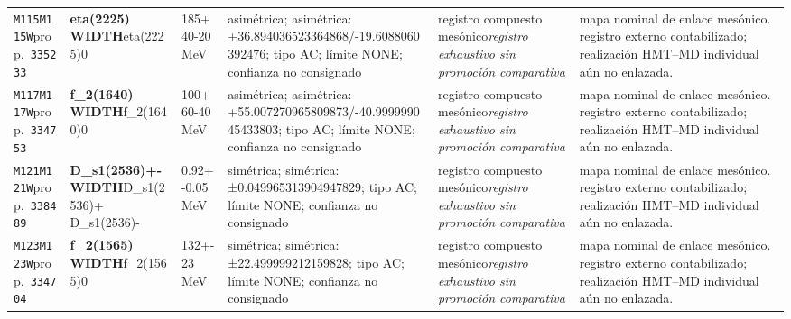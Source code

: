 \begin{landscape}
\begin{longtable}{L{1.85cm}L{4.45cm}L{2.35cm}L{4.05cm}L{3.35cm}L{7.15cm}}
\texttt{M115}\newline \texttt{M115W}\newline prop.\ \texttt{335233} & \textbf{eta(2225) WIDTH}\newline eta(2225)0 & 185+40-20\,MeV & asimétrica; asimétrica: +36.894036523364868/-19.6088060392476; tipo AC; límite NONE; confianza no consignado & registro compuesto mesónico\newline \emph{registro exhaustivo sin promoción comparativa} & mapa nominal de enlace mesónico. registro externo contabilizado; realización HMT--MD individual aún no enlazada. \\
\texttt{M117}\newline \texttt{M117W}\newline prop.\ \texttt{334753} & \textbf{f\_\allowbreak{}2(1640) WIDTH}\newline f\_\allowbreak{}2(1640)0 & 100+60-40\,MeV & asimétrica; asimétrica: +55.007270965809873/-40.999999045433803; tipo AC; límite NONE; confianza no consignado & registro compuesto mesónico\newline \emph{registro exhaustivo sin promoción comparativa} & mapa nominal de enlace mesónico. registro externo contabilizado; realización HMT--MD individual aún no enlazada. \\
\texttt{M121}\newline \texttt{M121W}\newline prop.\ \texttt{338489} & \textbf{D\_\allowbreak{}s1(2536)+- WIDTH}\newline D\_\allowbreak{}s1(2536)+ \textbar{}\allowbreak{} D\_\allowbreak{}s1(2536)- & 0.92+-0.05\,MeV & simétrica; simétrica: ±0.049965313904947829; tipo AC; límite NONE; confianza no consignado & registro compuesto mesónico\newline \emph{registro exhaustivo sin promoción comparativa} & mapa nominal de enlace mesónico. registro externo contabilizado; realización HMT--MD individual aún no enlazada. \\
\texttt{M123}\newline \texttt{M123W}\newline prop.\ \texttt{334704} & \textbf{f\_\allowbreak{}2(1565) WIDTH}\newline f\_\allowbreak{}2(1565)0 & 132+-23\,MeV & simétrica; simétrica: ±22.499999212159828; tipo AC; límite NONE; confianza no consignado & registro compuesto mesónico\newline \emph{registro exhaustivo sin promoción comparativa} & mapa nominal de enlace mesónico. registro externo contabilizado; realización HMT--MD individual aún no enlazada. \\

\end{longtable}
\end{landscape}
